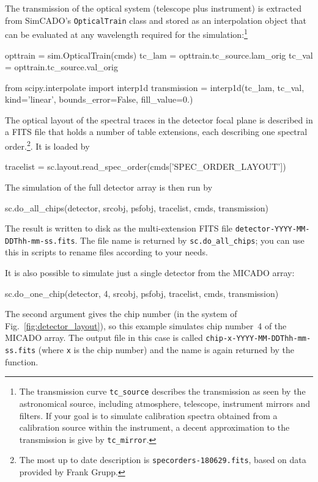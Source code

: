 \documentclass[a4paper,twoside,11pt]{article}
\begin{document}
The transmission of the optical system (telescope plus instrument) is
extracted from SimCADO's \lstinline{OpticalTrain} class and stored as
an interpolation object that can be evaluated at any wavelength
required for the simulation:\footnote{The transmission curve
  \lstinline{tc_source} describes the transmission as seen by the
  astronomical source, including atmosphere, telescope, instrument
  mirrors and filters. If your goal is to simulate calibration spectra
  obtained from a calibration source within the instrument, a decent
  approximation to the transmission is give by \lstinline{tc_mirror}.}
\begin{pyin}
opttrain = sim.OpticalTrain(cmds)
tc_lam = opttrain.tc_source.lam_orig
tc_val = opttrain.tc_source.val_orig

from scipy.interpolate import interp1d
transmission = interp1d(tc_lam, tc_val, kind='linear',
                        bounds_error=False, fill_value=0.)
\end{pyin}

The optical layout of the spectral traces in the detector focal plane
is described in a FITS file that holds a number of table extensions,
each describing one spectral order.\footnote{The most up to date
  description is \lstinline{specorders-180629.fits}, based on data
  provided by Frank Grupp.}. It is loaded by
\begin{pyin}
tracelist = sc.layout.read_spec_order(cmds['SPEC_ORDER_LAYOUT'])
\end{pyin}

The simulation of the full detector array is then run by
\begin{pyin}
sc.do_all_chips(detector, srcobj, psfobj, tracelist, cmds,
                transmission)
\end{pyin}
The result is written to disk as the multi-extension FITS file
\lstinline{detector-YYYY-MM-DDThh-mm-ss.fits}. The file name is
returned by \lstinline{sc.do_all_chips}; you can use this in scripts
to rename files according to your needs.

It is also possible to simulate just a single detector from the MICADO
array:
\begin{pyin}
sc.do_one_chip(detector, 4, srcobj, psfobj, tracelist, cmds,
               transmission)
\end{pyin}
The second argument gives the chip number (in the system of
Fig.~\ref{fig:detector_layout}), so this example simulates chip
number~4 of the MICADO array. The output file in this case is called
\lstinline{chip-x-YYYY-MM-DDThh-mm-ss.fits} (where \lstinline{x} is
the chip number) and the name is again returned by the function.
\end{document}
